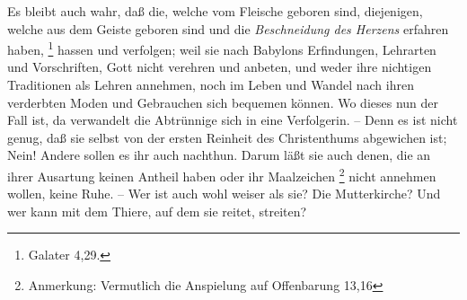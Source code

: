 Es bleibt auch wahr, daß die, welche vom Fleische geboren sind,
diejenigen, welche aus dem Geiste geboren sind und die \textit{Beschneidung des
Herzens}  erfahren haben,
\footnote{Galater 4,29.}
hassen und verfolgen; weil sie nach
Babylons Erfindungen, Lehrarten und Vorschriften, Gott nicht verehren und
anbeten, und weder ihre nichtigen Traditionen als Lehren annehmen, noch im Leben
und Wandel nach ihren verderbten Moden und Gebrauchen sich bequemen können.
Wo dieses nun der Fall ist, da verwandelt die Abtrünnige sich in eine
Verfolgerin.
-- Denn es ist nicht genug, daß sie selbst von der ersten Reinheit des
Christenthums abgewichen ist;
Nein!
Andere sollen es ihr auch nachthun.
Darum läßt sie auch denen, die an ihrer Ausartung keinen Antheil haben oder ihr
Maalzeichen
\footnote{Anmerkung: Vermutlich die Anspielung auf Offenbarung 13,16}
nicht annehmen wollen, keine Ruhe.
-- Wer ist auch wohl weiser als sie? Die Mutterkirche?
Und wer kann mit dem Thiere, auf dem sie reitet, streiten?

\medskip 

